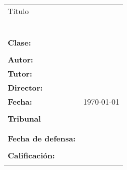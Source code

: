 %
%
\thispagestyle{plain}
\section*{}


\begin{tabular}{p{2cm}p{11cm}}
	\large{Título} & \\
	& \textbf{\large{\titulo}} \\
	\\
	& \textbf{\large{\titulogalego}} \\
	\\
	& \textbf{\large{\tituloenglish}} \\
	\\
	\large{\textbf{Clase:}} & \large{\proyectotipo} \\
	\\
	\large{\textbf{Autor:}} & \large{\autor} \\
	\large{\textbf{Tutor:}} & \large{\tutor} \\
	\large{\textbf{Director:}} & \large{\director} \\
	\large{\textbf{Fecha:}} & \large{\today} \\
	\\
	\large{\textbf{Tribunal}} & \\
	& \vspace{3cm} \\
	\\
	\large{\textbf{Fecha de defensa:}} & \\
	\\
	\large{\textbf{Calificación:}} & \\
	\\
\end{tabular}
